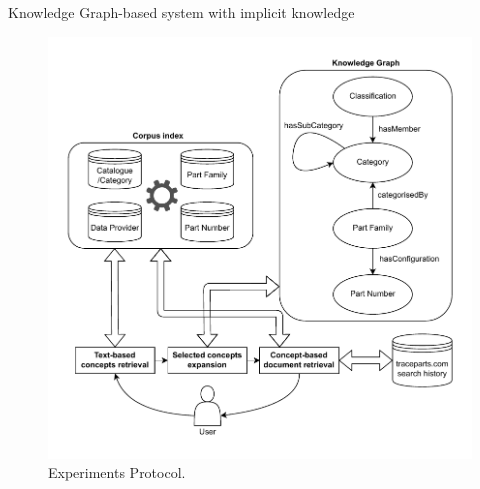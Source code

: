\begin{frame}{Knowledge Graph-based system with implicit knowledge}

    \begin{figure} [H]
        \begin{center}
            \includegraphics[scale=0.5]{images/tp-expe-kg-based-search-hist-sys.pdf} 
            \caption{Experiments Protocol.} 
        \end{center}
    \end{figure}

\end{frame}

